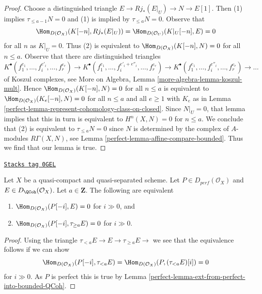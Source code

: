 \begin{proof}

Choose a distinguished triangle $E \to Rj_*(E|_U) \to N \to E[1]$. Then (1)
implies $\tau_{\leq a - 1}N = 0$ and (1) is implied by $\tau_{\leq a}N = 0$.
Observe that
$$
\Hom_{D(\mathcal{O}_X)}(K[-n], Rj_*(E|_U)) =
\Hom_{D(\mathcal{O}_U)}(K|_U[-n], E) = 0
$$
for all $n$ as $K|_U = 0$. Thus (2) is equivalent to
$\Hom_{D(\mathcal{O}_X)}(K[-n], N) = 0$ for all $n \leq a$.
Observe that there are distinguished triangles
$$
K^\bullet(f_1^{e_1}, \ldots, f_i^{e'_i}, \ldots, f_r^{e_r}) \to
K^\bullet(f_1^{e_1}, \ldots, f_i^{e'_i + e''_i}, \ldots, f_r^{e_r}) \to
K^\bullet(f_1^{e_1}, \ldots, f_i^{e''_i}, \ldots, f_r^{e_r}) \to \ldots
$$
of Koszul complexes, see
More on Algebra, Lemma \ref{more-algebra-lemma-koszul-mult}. Hence
$\Hom_{D(\mathcal{O}_X)}(K[-n], N) = 0$ for all $n \leq a$
is equivalent to
$\Hom_{D(\mathcal{O}_X)}(K_e[-n], N) = 0$ for all $n \leq a$ and all $e \geq 1$
with $K_e$ as in Lemma \ref{perfect-lemma-represent-cohomology-class-on-closed}.
Since $N|_U = 0$, that lemma implies that this in turn is equivalent to
$H^n(X, N) = 0$ for $n \leq a$. We conclude that (2) is equivalent to
$\tau_{\leq a}N = 0$ since $N$ is determined by the complex of
$A$-modules $R\Gamma(X, N)$, see Lemma \ref{perfect-lemma-affine-compare-bounded}.
Thus we find that our lemma is true.
\end{proof}

\begin{lemma}
\label{perfect-lemma-bounded-truncation}
\href{https://stacks.math.columbia.edu/tag/0GEL}{\texttt{Stacks tag 0GEL}}

Let $X$ be a quasi-compact and quasi-separated scheme.
Let $P \in D_{perf}(\mathcal{O}_X)$ and $E \in D_{\QCoh}(\mathcal{O}_X)$.
Let $a \in \mathbf{Z}$. The following are equivalent
\begin{enumerate}
\item $\Hom_{D(\mathcal{O}_X)}(P[-i], E) = 0$ for $i \gg 0$, and
\item $\Hom_{D(\mathcal{O}_X)}(P[-i], \tau_{\geq a} E) = 0$ for $i \gg 0$.
\end{enumerate}
\end{lemma}

\begin{proof}

Using the triangle $ \tau_{< a} E \to E \to \tau_{\geq a} E \to$
we see that the equivalence follows if we can show
$$
\Hom_{D(\mathcal{O}_X)}(P[-i], \tau_{< a} E) =
\Hom_{D(\mathcal{O}_X)}(P, (\tau_{< a} E)[i]) = 0
$$
for $i \gg 0$. As $P$ is perfect this is true by
Lemma \ref{perfect-lemma-ext-from-perfect-into-bounded-QCoh}.
\end{proof}

